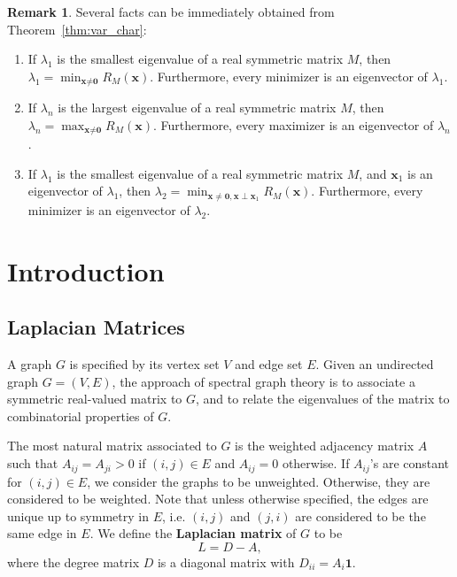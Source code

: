 \documentclass[a4paper]{article}
\theoremstyle{definition}
\newtheorem{remark}{Remark}[section]
\begin{document}
\begin{remark}
Several facts can be immediately obtained from Theorem~\ref{thm:var_char}:
\begin{enumerate}
    \item If $\lambda_1$ is the smallest eigenvalue of a real symmetric matrix $M$, then $\lambda_1=\min_{\textbf{x}\neq \textbf{0}}R_M(\textbf{x})$. Furthermore, every minimizer is an eigenvector of $\lambda_1$.
    \item If $\lambda_n$ is the largest eigenvalue of a real symmetric matrix $M$, then $\lambda_n=\max_{\textbf{x}\neq \textbf{0}}R_{M}(\textbf{x})$. Furthermore, every maximizer is an eigenvector of $\lambda_n$.
    \item If $\lambda_1$ is the smallest eigenvalue of a real symmetric matrix $M$, and $\textbf{x}_1$ is an eigenvector of $\lambda_1$, then $\lambda_2=\min_{\textbf{x}\neq \textbf{0}, \textbf{x}\perp\textbf{x}_1}R_M(\textbf{x})$. Furthermore, every minimizer is an eigenvector of $\lambda_2$.
\end{enumerate}
\end{remark}

\section{Introduction}

\subsection{Laplacian Matrices}

A graph $G$ is specified by its vertex set $V$ and edge set $E$. Given an undirected graph $G=(V, E)$, the approach of spectral graph theory is to associate a symmetric real-valued matrix to $G$, and to relate the eigenvalues of the matrix to combinatorial properties of $G$.

The most natural matrix associated to $G$ is the weighted adjacency matrix $A$ such that $A_{ij}=A_{ji}> 0$ if $(i, j)\in E$ and $A_{ij}=0$ otherwise. If $A_{ij}$'s are constant for $(i, j)\in E$, we consider the graphs to be unweighted. Otherwise, they are considered to be weighted. Note that unless otherwise specified, the edges are unique up to symmetry in $E$, i.e. $(i, j)$ and $(j, i)$ are considered to be the same edge in $E$. We define the \textbf{Laplacian matrix} of $G$ to be 
\begin{equation}
L=D-A,
\end{equation}
where the degree matrix $D$ is a diagonal matrix with $D_{ii}=A_i\textbf{1}$.
\end{document}
